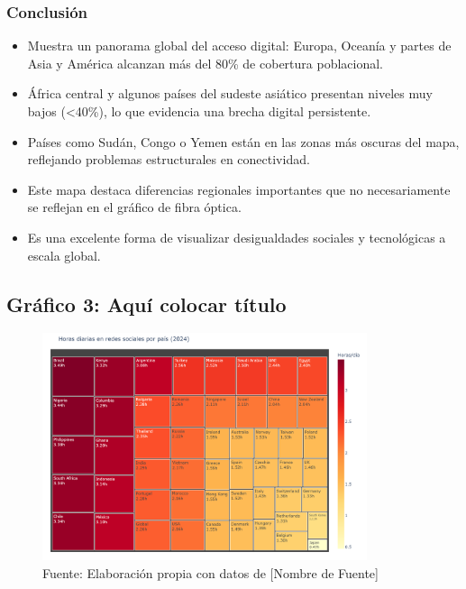 \documentclass[12pt, a4paper]{article}
\begin{document}
\subsubsection*{Conclusión}
\begin{itemize}
    \item Muestra un panorama global del acceso digital: Europa, Oceanía y partes de Asia y América alcanzan más del 80\% de cobertura poblacional.
    \item África central y algunos países del sudeste asiático presentan niveles muy bajos (<40\%), lo que evidencia una brecha digital persistente.
    \item Países como Sudán, Congo o Yemen están en las zonas más oscuras del mapa, reflejando problemas estructurales en conectividad.
    \item Este mapa destaca diferencias regionales importantes que no necesariamente se reflejan en el gráfico de fibra óptica.
    \item Es una excelente forma de visualizar desigualdades sociales y tecnológicas a escala global.
\end{itemize}



\subsection*{Gráfico 3: Aquí colocar título}
\begin{figure}[H]
    \centering
    \includegraphics[width=0.85\textwidth]{images/graph1_JG.png}
    \caption{Fuente: Elaboración propia con datos de [Nombre de Fuente]}
\end{figure}
\end{document}
